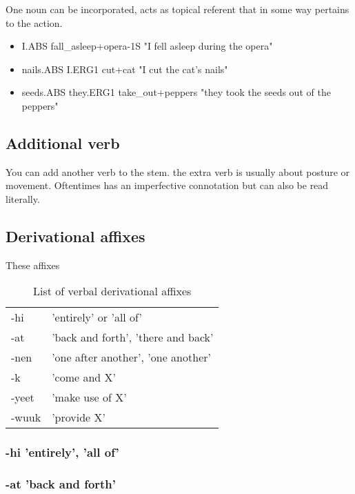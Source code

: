 \documentclass[smallroyalvopaper,9pt]{memoir}
\begin{document}
One noun can be incorporated, acts as topical referent that in some way pertains to the action.

\begin{itemize}
    \item I.ABS fall\_asleep+opera-1S "I fell asleep during the opera"
    \item nails.ABS I.ERG1 cut+cat "I cut the cat's nails"
    \item seeds.ABS they.ERG1 take\_out+peppers "they took the seeds out of the peppers"
\end{itemize}

\subsection{Additional verb}

You can add another verb to the stem. the extra verb is usually about posture or movement. Oftentimes has an imperfective connotation but can also be read literally.

\subsection{Derivational affixes}

These affixes 

\begin{table}[ht]
    \centering
    \begin{tabular}{ll}
        \toprule
        -hi & 'entirely' or 'all of' \\
        -at & 'back and forth', 'there and back' \\
        -nen & 'one after another', 'one another' \\
        -k & 'come and X' \\
        -yeet & 'make use of X' \\
        -wuuk & 'provide X' \\
        \bottomrule
    \end{tabular}
    \caption{List of verbal derivational affixes}
\end{table}

\subsubsection{-hi 'entirely', 'all of'}

\subsubsection{-at 'back and forth'}
\end{document}
